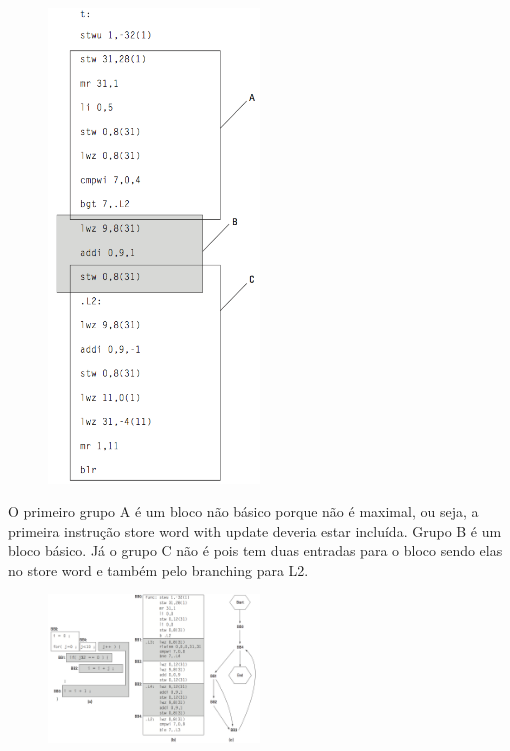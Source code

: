 \begin{figure}[H] \centering

	\includegraphics[width=0.5\textwidth]{img/f3-5.png}

	\caption{}

	\label{fig:f3-5}

\end{figure}



O primeiro grupo A é um bloco não básico porque não é maximal, ou seja, a primeira instrução store word with update deveria estar incluída. Grupo B é um bloco básico. Já o grupo C não é pois tem duas entradas para o bloco sendo elas no store word e também pelo branching para L2.



\begin{figure}[H] \centering

	\includegraphics[width=0.5\textwidth]{img/f3-6.png}

	\caption{}

	\label{fig:f3-6}

\end{figure}



